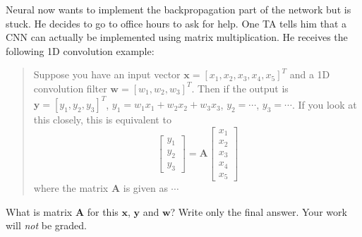 \documentclass[11pt,addpoints,answers]{exam}
\newcommand{\wv}{\mathbf{w}}
\newcommand{\xv}{\mathbf{x}}
\newcommand{\yv}{\mathbf{y}}
\newcommand{\Av}{\mathbf{A}}
\begin{document}
\begin{questions}
\begin{parts}
\begin{subparts}
\begin{your_solution}[height=1.75cm]
\begin{your_code_solution}
    \end{your_code_solution}
    
    \end{your_solution}

\newpage

\subpart[2] Neural now wants to implement the backpropagation part of the network but is stuck. He decides to go to office hours to ask for help. One TA tells him that a CNN can actually be implemented using matrix multiplication. He receives the following 1D convolution example:
\begin{quote}
    Suppose you have an input vector $\xv = [x_1, x_2, x_3, x_4, x_5]^T$ and a 1D convolution filter $\wv = [w_1, w_2, w_3]^T$. Then if the output is $\yv = [y_1, y_2, y_3]^T$, $y_1 = w_1 x_1 + w_2 x_2 + w_3 x_3$, $y_2 = \cdots$, $y_3 = \cdots$. If you look at this closely, this is equivalent to
    \[
    \begin{bmatrix} y_1 \\ y_2 \\ y_3 \end{bmatrix} = \Av \begin{bmatrix} x_1 \\ x_2 \\ x_3 \\ x_4 \\ x_5 \end{bmatrix}
    \]
    where the matrix $\Av$ is given as $\cdots$
\end{quote}
What is matrix $\Av$ for this $\xv$, $\yv$ and $\wv$? Write only the final answer. Your work will \textit{not} be graded. \\
    \begin{your_solution}[height=5cm]
    
    
    \end{your_solution}

\vspace{5mm}


\end{subparts}
\end{parts}
\end{questions}
\end{document}
